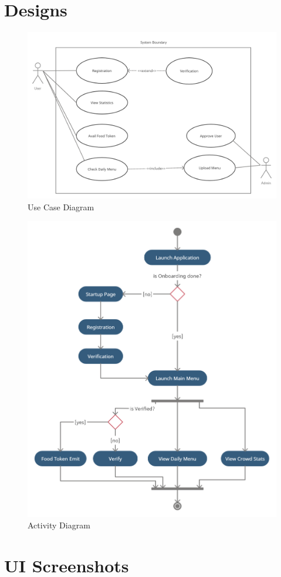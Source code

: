 \documentclass[12pt]{article}
\begin{document}
\newpage

\section*{\LARGE{Designs}}

\begin{figure}[H]
    \centering
    \includegraphics[width=0.7\linewidth]{usecase.jpg}
    \caption{Use Case Diagram}
\end{figure}

\begin{figure}[H]
    \centering
    \includegraphics[width=0.7\linewidth]{activity.jpg}
    \caption{Activity Diagram}
\end{figure}
\newpage

\section*{\LARGE{UI Screenshots}}
\end{document}
